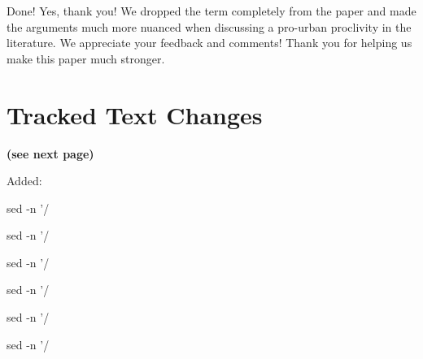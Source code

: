 
Done! Yes, thank you! We dropped the term completely from the paper and made the arguments much more nuanced when discussing a pro-urban proclivity in the literature. We appreciate your feedback and comments! Thank you for helping us make this paper much stronger.  

\newpage


\section{Tracked Text Changes}  
\textbf{(see next page)}




Added:
\begin{quote}

\end{quote}


sed -n '/%

sed -n '/%

sed -n '/%

sed -n '/%

sed -n '/%

sed -n '/%

